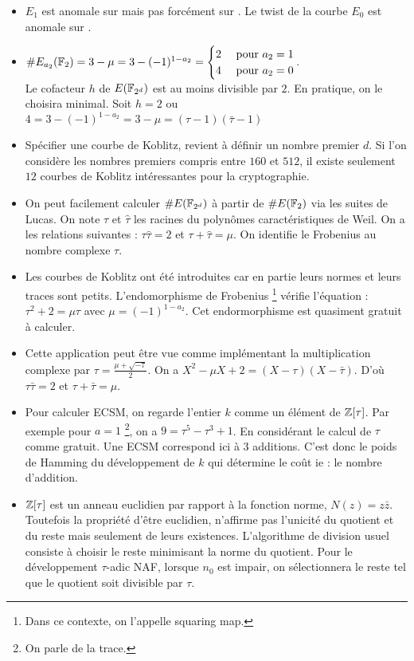 \documentclass[a4paper]{report}
\begin{document}
\begin{itemize}[label=$\bullet$]
    \item $E_1$ est anomale sur  mais pas forcément sur . Le twist de la courbe $E_0$ est anomale sur .
    \item  $\# E_{a_2}(\mathbb{F}_{2}) = 3 - \mu = 3 - (-1)^{1-a_2}  = \begin{cases} 2 & \text{ pour } a_2 = 1 \\ 4 & \text{ pour } a_2 = 0\end{cases}$.\\
    Le cofacteur $h$ de $E(\mathbb{F}_{2^d})$ est au moins divisible par $2$. En pratique, on le choisira minimal. Soit $h = 2 $ ou $4 = 3 - (-1)^{1-a_2} = 3 - \mu = (\tau - 1)(\bar{\tau} - 1)$
    \item Spécifier une courbe de Koblitz, revient à définir un nombre premier $d$. Si l'on considère les nombres premiers compris entre $160$ et $512$, il existe seulement $12$ courbes de Koblitz intéressantes pour la cryptographie.  
    \item On peut facilement calculer $\# E(\mathbb{F}_{2^d})$ à partir de $\# E(\mathbb{F}_{2})$ via les suites de Lucas. On note $\tau$ et $\hat{\tau}$ les racines du polynômes caractéristiques de Weil. On a les relations suivantes : $\tau \hat{\tau} = 2$ et $\tau + \hat{\tau} = \mu$. On identifie le Frobenius au nombre complexe $\tau$. 
    \item Les courbes de Koblitz ont été introduites car en partie leurs normes et leurs traces sont petits. L'endomorphisme de Frobenius \footnote{Dans ce contexte, on l'appelle squaring map.} vérifie l'équation : $\tau^2 + 2 = \mu \tau$ avec $\mu = (-1)^{1-a_2}$. Cet endormorphisme est quasiment gratuit à calculer. 
    \item Cette application peut être vue comme implémentant la multiplication complexe par $\tau = \frac{\mu + \sqrt{-7}}{2}$. On a $X^2 - \mu X + 2 = (X - \tau)(X - \bar{\tau})$. D'où $\tau \bar{\tau} = 2$ et $\tau + \bar{\tau} = \mu$.
    \item Pour calculer ECSM, on regarde l'entier $k$ comme un élément de $\mathbb{Z}[\tau]$. Par exemple pour $a = 1$ \footnote{On parle de la trace.}, on a $9 = \tau^5 - \tau^3 +1$. En considérant le calcul de $\tau$ comme gratuit. Une ECSM correspond ici à $3$ additions. C'est donc le poids de Hamming du développement de $k$ qui détermine le coût ie : le nombre d'addition.
    \item $\mathbb{Z}[\tau]$ est un anneau euclidien par rapport à la fonction norme, $N(z) = z \bar{z}$. Toutefois la propriété d'être euclidien, n'affirme pas l'unicité du quotient et du reste mais seulement de leurs existences. L'algorithme de division usuel consiste à choisir le reste minimisant la norme du quotient. Pour le développement $\tau$-adic NAF, lorsque $n_0$ est impair, on sélectionnera le reste tel que le quotient soit divisible par $\tau$.

\end{itemize}
\end{document}

